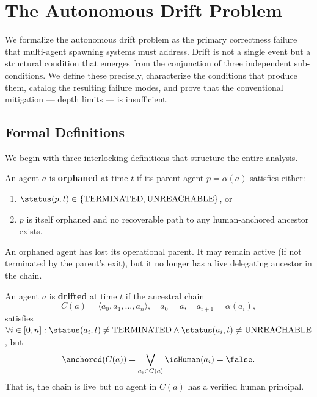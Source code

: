 \section{The Autonomous Drift Problem}
\label{sec:autonomous-drift}

We formalize the autonomous drift problem as the primary correctness failure that multi-agent spawning systems must address. Drift is not a single event but a structural condition that emerges from the conjunction of three independent sub-conditions. We define these precisely, characterize the conditions that produce them, catalog the resulting failure modes, and prove that the conventional mitigation — depth limits — is insufficient.

\subsection{Formal Definitions}

We begin with three interlocking definitions that structure the entire analysis.

\begin{definition}
\label{def:orphaned}
An agent $a$ is \textbf{orphaned} at time $t$ if its parent agent $p = \alpha(a)$ satisfies either:
\begin{enumerate}
    \item $\status(p, t) \in \{\text{TERMINATED}, \text{UNREACHABLE}\}$, or
    \item $p$ is itself orphaned and no recoverable path to any human-anchored ancestor exists.
\end{enumerate}
\end{definition}

An orphaned agent has lost its operational parent. It may remain active (if not terminated by the parent's exit), but it no longer has a live delegating ancestor in the chain.

\begin{definition}
\label{def:drifted}
An agent $a$ is \textbf{drifted} at time $t$ if the ancestral chain
\begin{equation}
C(a) = \langle a_0, a_1, \ldots, a_n \rangle,
\quad a_0 = a,\quad a_{i+1} = \alpha(a_i),
\end{equation}
satisfies $\forall i \in [0,n]: \status(a_i, t) \neq \text{TERMINATED} \land \status(a_i, t) \neq \text{UNREACHABLE}$, but
\begin{equation}
\anchored(C(a)) = \bigvee_{a_i \in C(a)} \isHuman(a_i) = \false.
\end{equation}
That is, the chain is live but no agent in $C(a)$ has a verified human principal.
\end{definition}

